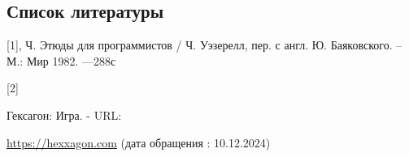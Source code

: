 \documentclass[a4paper]{article}
\begin{document}
\vspace{2cm}

\newpage

\begin{center}
   \section{Список литературы} 
\end{center}

\vspace{1cm}

\newcommand{\mytext}{%
    \textnormal{Гексагон: Игра. - URL: }%
}

\newcommand{\mytext}{%
    \textnormal{Этюды для программистов}%
}

[1], Ч.
\hypertarget{mytextlabel1}{%
    Этюды для программистов / Ч. Уэзерелл, пер. с англ. Ю. Баяковского.} – М.: Мир 1982. —288с

[2]\qquad\hypertarget{mytextlabel}{%
    \mytext
}
\href {https://hexxagon.com}{https://hexxagon.com} (дата обращения : 10.12.2024)
\end{document}
